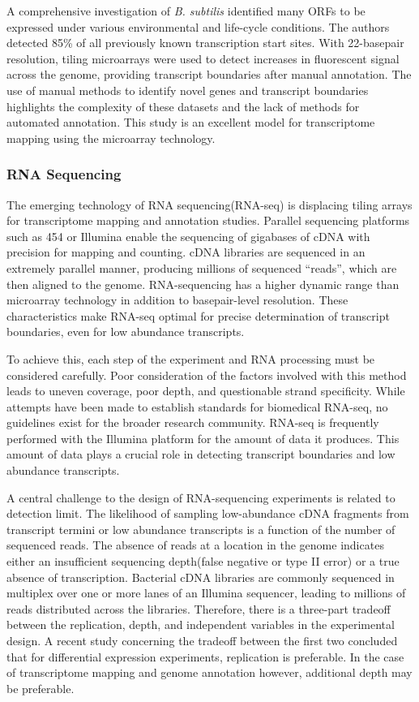 A comprehensive investigation of \textit{B. subtilis} identified many ORFs to be expressed under various environmental and life-cycle conditions.\cite{162} The authors detected 85\% of all previously known transcription start sites.\cite{162} With 22-basepair resolution, tiling microarrays were used to detect increases in fluorescent signal across the genome, providing transcript boundaries after manual annotation. The use of manual methods to identify novel genes and transcript boundaries highlights the complexity of these datasets and the lack of methods for automated annotation. This study\cite{162} is an excellent model for transcriptome mapping using the microarray technology.

\subsubsection{RNA Sequencing}
The emerging technology of RNA sequencing(RNA-seq) is displacing tiling arrays for transcriptome mapping and annotation studies.\cite{163} Parallel sequencing platforms such as 454\cite{166} or Illumina\cite{167} enable the sequencing of gigabases of cDNA with precision for mapping and counting. cDNA libraries are sequenced in an extremely parallel manner, producing millions of sequenced ``reads'', which are then aligned to the genome. RNA-sequencing has a higher dynamic range than microarray technology in addition to basepair-level resolution.\cite{163} These characteristics make RNA-seq optimal for precise determination of transcript boundaries, even for low abundance transcripts.

To achieve this, each step of the experiment and RNA processing must be considered carefully. Poor consideration of the factors involved with this method leads to uneven coverage,\cite{108,109,110,111,115} poor depth,\cite{114,115} and questionable strand specificity.\cite{113} While attempts have been made to establish standards for biomedical RNA-seq,\cite{110} no guidelines exist for the broader research community. RNA-seq is frequently performed with the Illumina platform for the amount of data it produces. This amount of data plays a crucial role in detecting transcript boundaries and low abundance transcripts.

A central challenge to the design of RNA-sequencing experiments is related to detection limit. The likelihood of sampling low-abundance cDNA fragments from transcript termini or low abundance transcripts is a function of the number of sequenced reads.\cite{108,109,110,112} The absence of reads at a location in the genome indicates either an insufficient sequencing depth(false negative or type II error) or a true absence of transcription. Bacterial cDNA libraries are commonly sequenced in multiplex over one or more lanes of an Illumina sequencer, leading to millions of reads distributed across the libraries. Therefore, there is a three-part tradeoff between the replication, depth, and independent variables in the experimental design. A recent study concerning the tradeoff between the first two concluded that for differential expression experiments, replication is preferable.\cite{112} In the case of transcriptome mapping and genome annotation however, additional depth may be preferable.\cite{110}

